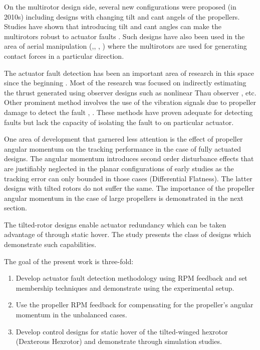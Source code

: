 \par On the multirotor design side, several new configurations were proposed (in 2010s) including designs with changing tilt and cant angels of the propellers. Studies have shown that introducing tilt and cant angles can make the multirotors robust to actuator faults \cite{Rajappa2015}. Such designs have also been used in the area of aerial manipulation (\cite{Tognon2019},\cite{Nava2020}, \cite{lulu1}, \cite{lulu2}) where the multirotors are used for generating contact forces in a particular direction.

\par The actuator fault detection has been an important area of research in this space since the beginning \cite{6935563}. Most of the research was focused on indirectly estimating the thrust generated using observer designs such as nonlinear Thau observer \cite{hasan2018model}, etc. Other prominent method involves the use of the vibration signals due to propeller damage to detect the fault \cite{puchalski2022actuator}, \cite{thanaraj2023actuator}. These methods have proven adequate for detecting faults but lack the capacity of isolating the fault to on particular actuator.

\par One area of development that garnered less attention is the effect of propeller angular momentum on the tracking
performance in the case of fully actuated designs. The angular momentum introduces second order disturbance effects that
are justifiably neglected in the planar configurations of early studies as the tracking error can only bounded in those cases (Differential Flatness). The latter designs with tilted rotors do not suffer the same. The importance of the propeller angular momentum in the case of large propellers is demonstrated in the next section.

\par The tilted-rotor designs enable actuator redundancy which can be taken advantage of through static hover\cite{Bicego2020}. The study \cite{Michieletto2018} presents the class of designs which demonstrate such capabilities.

\par The goal of the present work is three-fold:
\begin{enumerate}
        \item Develop actuator fault detection methodology using RPM feedback and set membership techniques and demonstrate using the experimental setup.
        \item Use the propeller RPM feedback for compensating for the propeller's angular momentum in the unbalanced cases.
        \item Develop control designs for static hover of the tilted-winged hexrotor (Dexterous Hexrotor) and demonstrate through simulation studies.
\end{enumerate}


